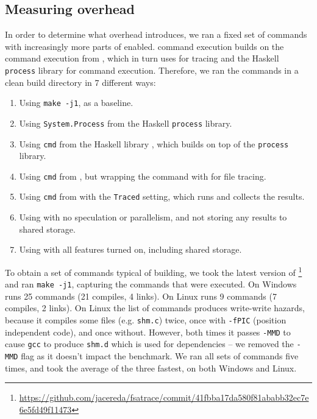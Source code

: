\subsection{Measuring overhead}
\label{sec:eval:overhead}

In order to determine what overhead \Rattle introduces, we ran a fixed set of commands with increasingly more parts of \Rattle enabled. \Rattle command execution builds on the command execution from \Shake \cite{shake}, which in turn uses \Fsatrace for tracing and the Haskell \texttt{process} library for command execution. Therefore, we ran the commands in a clean build directory in 7 different ways:

\begin{enumerate}
\item Using \texttt{make -j1}, as a baseline.
\item Using \texttt{System.Process} from the Haskell \texttt{process} library.
\item Using \texttt{cmd} from the Haskell \Shake library \cite{shake}, which builds on top of the \texttt{process} library.
\item Using \texttt{cmd} from \Shake, but wrapping the command with \Fsatrace for file tracing.
\item Using \texttt{cmd} from \Shake with the \texttt{Traced} setting, which runs \Fsatrace and collects the results.
\item Using \Rattle with no speculation or parallelism, and not storing any results to shared storage.
\item Using \Rattle with all features turned on, including shared storage.
\end{enumerate}

To obtain a set of commands typical of building, we took the latest version of \Fsatrace\footnote{\url{https://github.com/jacereda/fsatrace/commit/41fbba17da580f81ababb32ec7e6e5fd49f11473}} and ran \texttt{make -j1}, capturing the commands that were executed. On Windows \Fsatrace runs 25 commands (21 compiles, 4 links). On Linux \Fsatrace runs 9 commands (7 compiles, 2 links). On Linux the list of commands produces write-write hazards, because it compiles some files (e.g. \texttt{shm.c}) twice, once with \texttt{-fPIC} (position independent code), and once without. However, both times it passes \texttt{-MMD} to cause \texttt{gcc} to produce \texttt{shm.d} which is used for dependencies -- we removed the \texttt{-MMD} flag as it doesn't impact the benchmark. We ran all sets of commands five times, and took the average of the three fastest, on both Windows and Linux.


